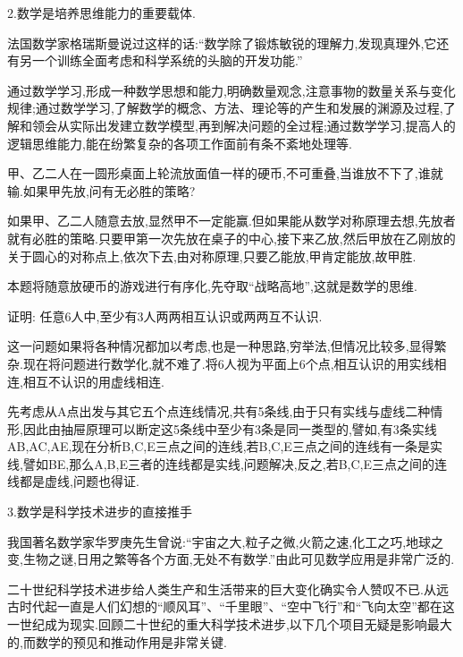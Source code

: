 2.数学是培养思维能力的重要载体.

法国数学家格瑞斯曼说过这样的话:“数学除了锻炼敏锐的理解力,发现真理外,它还有另一个训练全面考虑和科学系统的头脑的开发功能.”

通过数学学习,形成一种数学思想和能力,明确数量观念,注意事物的数量关系与变化规律;通过数学学习,了解数学的概念、方法、理论等的产生和发展的渊源及过程,了解和领会从实际出发建立数学模型,再到解决问题的全过程;通过数学学习,提高人的逻辑思维能力,能在纷繁复杂的各项工作面前有条不紊地处理等.

\begin{example}
	甲、乙二人在一圆形桌面上轮流放面值一样的硬币,不可重叠,当谁放不下了,谁就输.如果甲先放,问有无必胜的策略?
\end{example}

\begin{analysis}
	如果甲、乙二人随意去放,显然甲不一定能赢.但如果能从数学对称原理去想,先放者就有必胜的策略.只要甲第一次先放在桌子的中心,接下来乙放,然后甲放在乙刚放的关于圆心的对称点上,依次下去,由对称原理,只要乙能放,甲肯定能放,故甲胜.

	本题将随意放硬币的游戏进行有序化,先夺取“战略高地”,这就是数学的思维.
\end{analysis}

\begin{example}
	证明: 任意6人中,至少有3人两两相互认识或两两互不认识.
\end{example}

\begin{analysis}
	这一问题如果将各种情况都加以考虑,也是一种思路,穷举法,但情况比较多,显得繁杂.现在将问题进行数学化,就不难了.将6人视为平面上6个点,相互认识的用实线相连,相互不认识的用虚线相连.

	先考虑从A点出发与其它五个点连线情况,共有5条线,由于只有实线与虚线二种情形,因此由抽屉原理可以断定这5条线中至少有3条是同一类型的,譬如,有3条实线AB,AC,AE,现在分析B,C,E三点之间的连线,若B,C,E三点之间的连线有一条是实线,譬如BE,那么A,B,E三者的连线都是实线,问题解决,反之,若B,C,E三点之间的连线都是虚线,问题也得证.
\end{analysis}

3.数学是科学技术进步的直接推手

我国著名数学家华罗庚先生曾说:“宇宙之大,粒子之微,火箭之速,化工之巧,地球之变,生物之谜,日用之繁等各个方面,无处不有数学.”由此可见数学应用是非常广泛的.

二十世纪科学技术进步给人类生产和生活带来的巨大变化确实令人赞叹不已.从远古时代起一直是人们幻想的“顺风耳”、“千里眼”、“空中飞行”和“飞向太空”都在这一世纪成为现实.回顾二十世纪的重大科学技术进步,以下几个项目无疑是影响最大的,而数学的预见和推动作用是非常关键.

